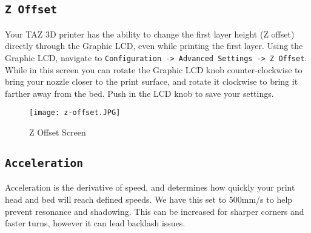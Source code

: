 \subsection{\texttt{Z Offset}}
Your TAZ 3D printer has the ability to change the first layer height (Z offset) directly through the Graphic LCD, even while printing the first layer. Using the Graphic LCD, navigate to \texttt{Configuration -> Advanced Settings -> Z Offset}. While in this screen you can rotate the Graphic LCD knob counter-clockwise to bring your nozzle closer to the print surface, and rotate it clockwise to bring it farther away from the bed. Push in the LCD knob to save your settings.

\begin{figure}[H]
\centering
\texttt{[image: z-offset.JPG]}
\caption{Z Offset Screen}
\label{fig:Z_offset_screen}
\end{figure}



\subsection{\texttt{Acceleration}}
Acceleration is the derivative of speed, and determines how quickly your print head and bed will reach defined speeds. We have this set to 500mm/s\textsuperscript{} to help prevent resonance and shadowing. This can be increased for sharper corners and faster turns, however it can lead backlash issues.

